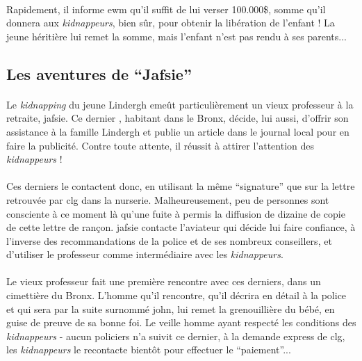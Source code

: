 \paragraph{} Rapidement, il informe \gls{ewm} qu'il suffit de lui verser 100.000\$, somme qu'il donnera aux \emph{kidnappeurs}, bien 
sûr, pour obtenir la libération de l'enfant ! La jeune héritière lui remet la somme, mais l'enfant n'est pas rendu à ses parents...
\subsection{Les aventures de ``Jafsie''}
\paragraph{} Le \emph{kidnapping} du jeune Lindergh emeût particulièrement un vieux professeur à la retraite, \gls{jafsie}. Ce dernier 
, habitant dans le Bronx, décide, lui aussi, d'offrir son assistance à la famille Lindergh et publie un article dans le journal local
pour en faire la publicité. Contre toute attente, il réussit à attirer l'attention des \emph{kidnappeurs} !
\paragraph{} Ces derniers le contactent donc, en utilisant la même ``signature'' que sur la lettre retrouvée par \gls{clg} dans la nurserie.
Malheureusement, peu de personnes sont consciente à ce moment là qu'une fuite à permis la diffusion de dizaine de copie de cette lettre
de rançon. \gls{jafsie} contacte l'aviateur qui décide lui faire confiance, à l'inverse des recommandations de la police et de ses nombreux
conseillers, et d'utiliser le professeur comme intermédiaire avec les \emph{kidnappeurs}. 
\paragraph{} Le vieux professeur fait une première rencontre avec ces derniers, dans un cimettière du Bronx. L'homme qu'il rencontre, qu'il
décrira en détail à la police et qui sera par la suite surnommé \gls{john}, lui remet la grenouillière du bébé, en guise de preuve de sa 
bonne foi. Le veille homme ayant respecté les conditions des \emph{kidnappeurs} - aucun policiers n'a suivit ce dernier, à la demande express
de \gls{clg}, les \emph{kidnappeurs} le recontacte bientôt pour effectuer le ``paiement''...
 

